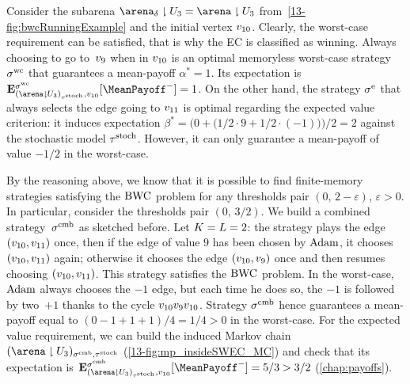 \begin{example}
Consider the subarena $\gameNonZero \reduc \ec_{3} = \arena \reduc \ec_{3}$ from~\cref{13-fig:bwcRunningExample} and the initial vertex $v_{10}$. Clearly, the worst-case requirement can be satisfied, that is why the EC is classified as winning. Always choosing to go to~$v_{9}$ when in $v_{10}$ is an optimal memoryless worst-case strategy $\sigma^{\text{wc}}$ that guarantees a mean-payoff $\alpha^\ast = 1$. Its expectation is $\expv^{\stratWC}_{(\arena \reduc \ec_{3})_{\tau^\text{stoch}},v_{10}}[\MeanPayoff^{-}] = 1$. On the other hand, the strategy $\sigma^{\text{e}}$ that always selects the edge going to $v_{11}$ is optimal regarding the expected value criterion: it induces expectation $\beta^\ast = \big(0 + \big(1/2 \cdot 9 + 1/2 \cdot (-1)\big)\big)/2 = 2$ against the stochastic model $\tau^{\text{stoch}} $. However, it can only guarantee a mean-payoff of value $-1/2$ in the worst-case.

By the reasoning above, we know that it is possible to find finite-memory strategies satisfying the $\text{BWC}$ problem for any thresholds pair $(0,\, 2 - \varepsilon)$, $\varepsilon > 0$. In particular, consider the thresholds pair $(0,\, 3/2)$. We build a combined strategy~$\sigma^{\text{cmb}}$ as sketched before. Let $K = L = 2$: the strategy plays the edge $(v_{10}, v_{11})$ once, then if the edge of value $9$ has been chosen by $\text{Adam}$, it chooses $(v_{10}, v_{11})$ again; otherwise it chooses the edge $(v_{10}, v_{9})$ once and then resumes choosing $(v_{10}, v_{11})$. This strategy satisfies the $\text{BWC}$ problem. In the worst-case,~$\text{Adam}$ always chooses the $-1$ edge, but each time he does so, the $-1$ is followed by two~$+1$ thanks to the cycle $v_{10} v_{9} v_{10}$. Strategy $\sigma^{\text{cmb}}$ hence guarantees a mean-payoff equal to $(0 - 1 + 1 + 1)/4 = 1/4 > 0$ in the worst-case. For the expected value requirement, we can build the induced Markov chain $(\arena \reduc \ec_{3})_{\stratComb, \tau^\text{stoch}}$ (\cref{13-fig:mp_insideSWEC_MC}) and check that its expectation is $\expv^{\stratComb}_{(\arena \reduc \ec_{3})_{\tau^\text{stoch}},v_{10}}[\MeanPayoff^{-}] = 5/3 > 3/2$ (\cref{chap:payoffs}).


\end{example}
